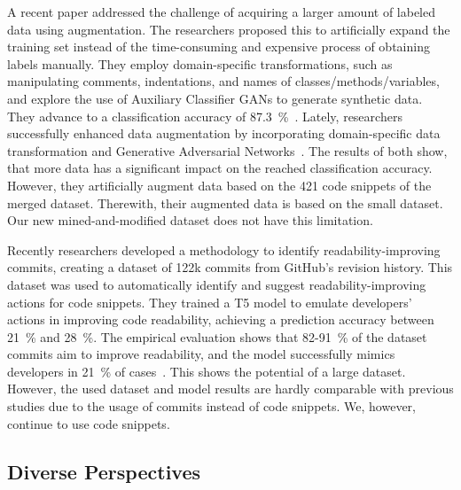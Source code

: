 \documentclass[%
class=scrreprt,
chapterprefix=false,%
open=right,%
twoside=false,%
paper=a4,%
logofile={Logo\_zentral\_farbig\_EN.png},%
thesistype=master,%
UKenglish,%
]{se2thesis}
\theoremstyle{definition}
\newcommand{\numMerged}{421\xspace}
\begin{document}
	A recent paper addressed the challenge of acquiring a larger amount of labeled data using augmentation. The researchers proposed this to artificially expand the training set instead of the time-consuming and expensive process of obtaining labels manually. They employ domain-specific transformations, such as manipulating comments, indentations, and names of classes/methods/variables, and explore the use of Auxiliary Classifier GANs to generate synthetic data. They advance to a classification accuracy of 87.3~\%~\cite{mi2021effectiveness}.
	Lately, researchers successfully enhanced data augmentation by incorporating domain-specific data transformation and Generative Adversarial Networks~\cite{mi2022enhanced}.
	The results of both show, that more data has a significant impact on the reached classification accuracy. However, they artificially augment data based on the \numMerged code snippets of the merged dataset. Therewith, their augmented data is based on the small dataset. Our new mined-and-modified dataset does not have this limitation.
	
	Recently researchers developed a methodology to identify readability-improving commits, creating a dataset of 122k commits from GitHub's revision history. This dataset was used to automatically identify and suggest readability-improving actions for code snippets. They trained a T5 model to emulate developers' actions in improving code readability, achieving a prediction accuracy between 21~\% and 28~\%. The empirical evaluation shows that 82-91~\% of the dataset commits aim to improve readability, and the model successfully mimics developers in 21~\% of cases~\cite{vitale2023using}. 
	This shows the potential of a large dataset. However, the used dataset and model results are hardly comparable with previous studies due to the usage of commits instead of code snippets. We, however, continue to use code snippets.
		
	
\subsection{Diverse Perspectives} \label{Diverse Perspectives}
\end{document}
